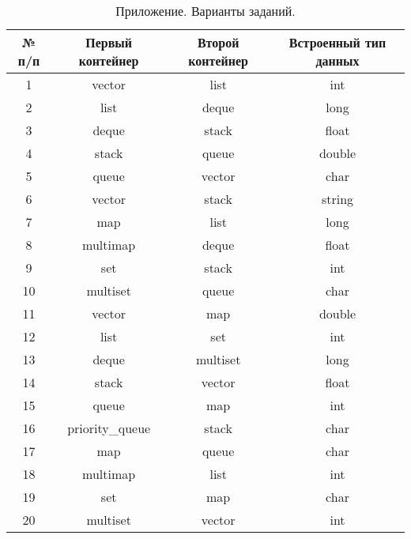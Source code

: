 \begin{table}[!htp]
    \centering
    \caption{Приложение. Варианты заданий.}
    \label{table:options}

    \begin{tabular}{|c|c|c|c|} 
        \hline
        № п/п & Первый контейнер & Второй контейнер & Встроенный тип данных \\ \hline
        \hline
        1     & vector           & list             & int                   \\ \hline
        2     & list             & deque            & long                  \\ \hline
        3     & deque            & stack            & float                 \\ \hline
        4     & stack            & queue            & double                \\ \hline
        5     & queue            & vector           & char                  \\ \hline
        6     & vector           & stack            & string                \\ \hline
        7     & map              & list             & long                  \\ \hline
        8     & multimap         & deque            & float                 \\ \hline
        9     & set              & stack            & int                   \\ \hline
        10    & multiset         & queue            & char                  \\ \hline
        11    & vector           & map              & double                \\ \hline
        12    & list             & set              & int                   \\ \hline
        13    & deque            & multiset         & long                  \\ \hline
        14    & stack            & vector           & float                 \\ \hline
        15    & queue            & map              & int                   \\ \hline
        16    & priority\_queue   & stack            & char                 \\ \hline
        17    & map              & queue            & char                  \\ \hline
        18    & multimap         & list             & int                   \\ \hline
        19    & set              & map              & char                  \\ \hline
        20    & multiset         & vector           & int                   \\ \hline
    \end{tabular}
\end{table}
